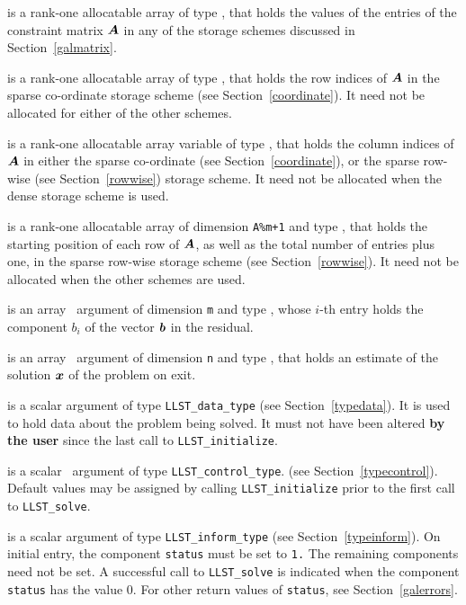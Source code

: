 \documentclass{galahad}
\newcommand{\packagename}{LLST}
\begin{document}
\begin{description}
\begin{description}
 is a rank-one allocatable array of type \realdp, that holds
the values of the entries of the constraint matrix ${\bm{A}}$ in any of the
storage schemes discussed in Section~\ref{galmatrix}.

 is a rank-one allocatable array of type \integer,
that holds the row indices of ${\bm{A}}$ in the sparse co-ordinate storage
scheme (see Section~\ref{coordinate}).
It need not be allocated for either of the other schemes.

 is a rank-one allocatable array variable of type \integer,
that holds the column indices of ${\bm{A}}$ in either the sparse co-ordinate
(see Section~\ref{coordinate}), or the sparse row-wise
(see Section~\ref{rowwise}) storage scheme.
It need not be allocated when the dense storage scheme is used.

 is a rank-one allocatable array of dimension {\tt A\%m+1} and type
\integer, that holds the starting position of
each row of ${\bm{A}}$, as well
as the total number of entries plus one, in the sparse row-wise storage
scheme (see Section~\ref{rowwise}). It need not be allocated when the
other schemes are used.
\end{description}

 is an array \intentin\ argument of dimension {\tt m} and
type \realdp,  whose $i$-th entry holds the component $b_i$ of
the vector ${\bm{b}}$ in the residual.

 is an array \intentout\ argument of dimension {\tt n} and
type \realdp, that holds an estimate of the solution ${\bm{x}}$
of the problem on exit.

 is a scalar \intentinout argument of type
{\tt \packagename\_data\_type}
(see Section~\ref{typedata}). It is used to hold data about the problem being
solved. It must not have been altered {\bf by the user} since the last call to
{\tt \packagename\_initialize}.

 is a scalar \intentin\ argument of type
{\tt \packagename\_control\_type}.
(see Section~\ref{typecontrol}).
Default values may be assigned by calling {\tt \packagename\_initialize}
prior to the first call to {\tt \packagename\_solve}.

 is a scalar \intentinout argument of type
{\tt \packagename\_inform\_type}
(see Section~\ref{typeinform}).
On initial entry, the component {\tt status} must be set to {\tt 1.}
The remaining components need not be set.
A successful call to
{\tt \packagename\_solve}
is indicated when the  component {\tt status} has the value 0.
For other return values of {\tt status}, see Section~\ref{galerrors}.


\end{description}
\end{document}
